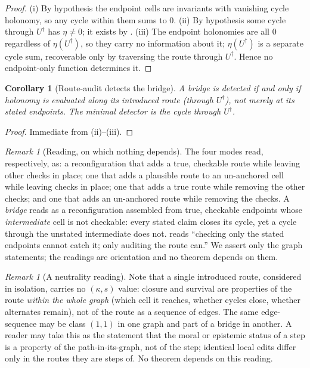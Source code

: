 \documentclass[11pt,a4paper]{article}
\theoremstyle{thmstyle}
\newtheorem{corollary}[theorem]{Corollary}
\theoremstyle{definition}
\theoremstyle{remark}
\newtheorem{remark}[theorem]{Remark}
\newcommand{\hol}{\eta}            %
\begin{document}
\begin{proof}
(i) By hypothesis the endpoint cells are invariants with vanishing cycle
holonomy, so any cycle within them sums to $0$. (ii) By hypothesis some cycle
through $U^\dagger$ has $\hol\neq0$; it exists by . (iii)
The endpoint holonomies are all $0$ regardless of $\hol(U^\dagger)$, so they
carry no information about it; $\hol(U^\dagger)$ is a separate cycle sum,
recoverable only by traversing the route through $U^\dagger$. Hence no
endpoint-only function determines it.
\end{proof}

\begin{corollary}[Route-audit detects the bridge]
\label{cor:routeaudit}
A bridge is detected if and only if holonomy is evaluated along its
introduced route (through $U^\dagger$), not merely at its stated endpoints.
The minimal detector is the cycle through $U^\dagger$.
\end{corollary}

\begin{proof}
Immediate from (ii)--(iii).
\end{proof}

\begin{remark}[Reading, on which nothing depends]
\label{rem:modes-read}
The four modes read, respectively, as: a reconfiguration that adds a true,
checkable route while leaving other checks in place; one that adds a
plausible route to an un-anchored cell while leaving checks in place; one
that adds a true route while removing the other checks; and one that adds an
un-anchored route while removing the checks. A \emph{bridge} reads as a
reconfiguration assembled from true, checkable endpoints whose
\emph{intermediate} cell is not checkable: every stated claim closes its
cycle, yet a cycle through the unstated intermediate does not.
 reads ``checking only the stated endpoints cannot catch
it; only auditing the route can.'' We assert only the graph statements; the
readings are orientation and no theorem depends on them.
\end{remark}

\begin{remark}[A neutrality reading]
\label{rem:neutral}
Note that a single introduced route, considered in isolation, carries no
$(\kappa,s)$ value: closure and survival are properties of the route
\emph{within the whole graph} (which cell it reaches, whether cycles close,
whether alternates remain), not of the route as a sequence of edges. The
same edge-sequence may be class $(1,1)$ in one graph and part of a bridge in
another. A reader may take this as the statement that the moral or epistemic
status of a step is a property of the path-in-its-graph, not of the step;
identical local edits differ only in the routes they are steps of. No theorem
depends on this reading.
\end{remark}
\end{document}
